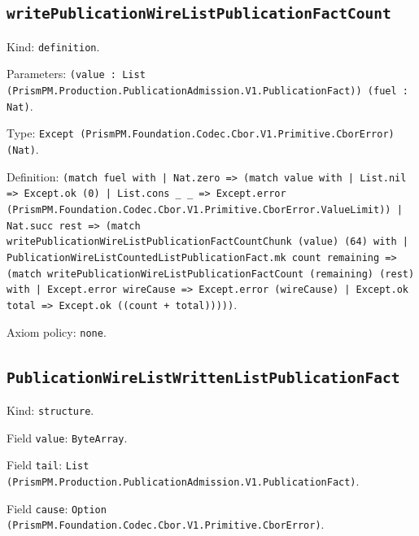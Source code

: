 \documentclass[11pt]{article}
\begin{document}
\subsection*{\texttt{writePublicationWireListPublicationFactCount}}
\noindent Kind: \texttt{definition}.\par
\noindent Parameters: \texttt{(value : List (PrismPM.Production.PublicationAdmission.V1.PublicationFact)) (fuel : Nat)}.\par
\noindent Type: \texttt{Except (PrismPM.Foundation.Codec.Cbor.V1.Primitive.CborError) (Nat)}.\par
\noindent Definition: \texttt{(match fuel with | Nat.zero => (match value with | List.nil => Except.ok (0) | List.cons \_ \_ => Except.error (PrismPM.Foundation.Codec.Cbor.V1.Primitive.CborError.ValueLimit)) | Nat.succ rest => (match writePublicationWireListPublicationFactCountChunk (value) (64) with | PublicationWireListCountedListPublicationFact.mk count remaining => (match writePublicationWireListPublicationFactCount (remaining) (rest) with | Except.error wireCause => Except.error (wireCause) | Except.ok total => Except.ok ((count + total)))))}.\par
\noindent Axiom policy: \texttt{none}.\par
\subsection*{\texttt{PublicationWireListWrittenListPublicationFact}}
\noindent Kind: \texttt{structure}.\par
\noindent Field \texttt{value}: \texttt{ByteArray}.\par
\noindent Field \texttt{tail}: \texttt{List (PrismPM.Production.PublicationAdmission.V1.PublicationFact)}.\par
\noindent Field \texttt{cause}: \texttt{Option (PrismPM.Foundation.Codec.Cbor.V1.Primitive.CborError)}.\par
\end{document}
